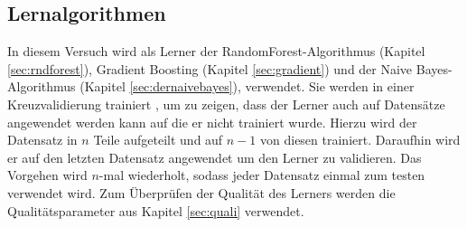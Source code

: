 \subsection{Lernalgorithmen}
\label{sec:lernalgo}

In diesem Versuch wird als Lerner der RandomForest-Algorithmus (Kapitel \ref{sec:rndforest}), Gradient Boosting (Kapitel \ref{sec:gradient}) und der Naive Bayes-Algorithmus (Kapitel \ref{sec:dernaivebayes}), verwendet. 
Sie werden in einer Kreuzvalidierung trainiert , um zu zeigen, dass der Lerner auch auf Datensätze angewendet werden kann auf die er nicht trainiert wurde. 
Hierzu wird der Datensatz in $n$ Teile aufgeteilt und auf $n-1$ von diesen trainiert. Daraufhin wird er auf den letzten Datensatz angewendet um den Lerner zu validieren. 
Das Vorgehen wird $n$-mal wiederholt, sodass jeder Datensatz einmal zum testen verwendet wird. 
Zum Überprüfen der Qualität des Lerners werden die Qualitätsparameter aus Kapitel \ref{sec:quali} verwendet.









